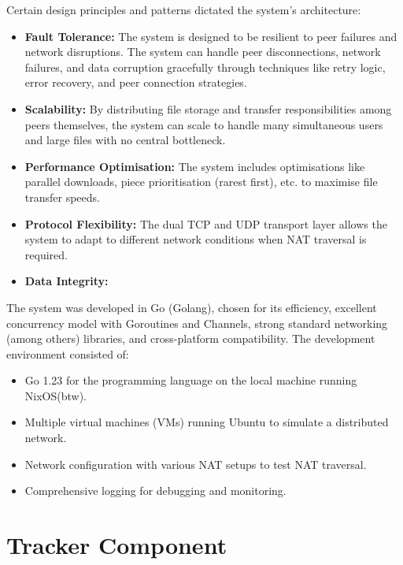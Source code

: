\documentclass[12pt,a4paper]{report}
\begin{document}
Certain design principles and patterns dictated the system's architecture:
\begin{itemize}
	\item \textbf{Fault Tolerance:} The system is designed to be resilient to peer failures and network disruptions. The system can handle peer disconnections, network failures, and data corruption gracefully through techniques like retry logic, error recovery, and peer connection strategies.
	\item \textbf{Scalability:} By distributing file storage and transfer responsibilities among peers themselves, the system can scale to handle many simultaneous users and large files with no central bottleneck.
	\item \textbf{Performance Optimisation:} The system includes optimisations like parallel downloads, piece prioritisation (rarest first), etc. to maximise file transfer speeds.
	\item \textbf{Protocol Flexibility:} The dual TCP and UDP transport layer allows the system to adapt to different network conditions when NAT traversal is required.
	\item \textbf{Data Integrity:} 
\end{itemize}

The system was developed in Go (Golang), chosen for its efficiency, excellent concurrency model with Goroutines and Channels, strong standard networking (among others) libraries, and cross-platform compatibility. The development environment consisted of:
\begin{itemize}
	\item Go 1.23 for the programming language on the local machine running NixOS(btw).
	\item Multiple virtual machines (VMs) running Ubuntu to simulate a distributed network.
	\item Network configuration with various NAT setups to test NAT traversal.
	\item Comprehensive logging for debugging and monitoring.
\end{itemize}

\section{Tracker Component}
\end{document}
